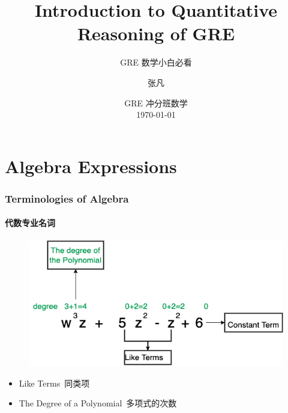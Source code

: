 \documentclass[
	11pt, %
	handout,
]{beamer}
\title[Into to QR]{Introduction to Quantitative Reasoning of GRE} %
\subtitle{GRE 数学小白必看} %
\author[张凡]{张凡} %
\institute[XDF]{新东方国际教育 \\ \smallskip \textit{zhangfan@xdf.cn}} %
\date[\today]{GRE 冲分班数学 \\ \today} %
\begin{document}

\begin{frame}
	\titlepage %
\end{frame}






\section{Algebra Expressions}


\begin{frame}
	\frametitle{Terminologies of Algebra}
	\framesubtitle{代数专业名词}
	
			\begin{figure}
				\includegraphics[width=0.8\linewidth]{Polynomial.png}
			\end{figure}
			\begin{itemize}
				\item Like Terms\ 同类项
				\item The Degree of a Polynomial\ 多项式的次数
			\end{itemize}
\end{frame}

\end{document}
